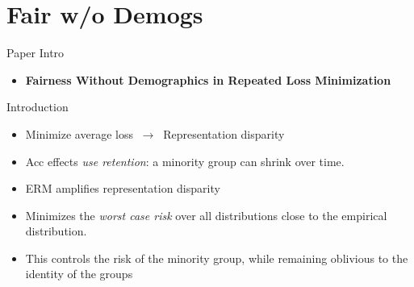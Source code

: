 \documentclass{beamer}
\begin{document}
\section{Fair w/o Demogs}
\begin{viterbiframe}{{Paper Intro}}
\begin{itemize}
    \item {\bf Fairness Without Demographics in Repeated Loss Minimization}
\end{itemize}
\end{viterbiframe}

\begin{viterbiframe}{Introduction}
    \begin{itemize}
        \item Minimize average loss $~\rightarrow~$ Representation disparity
        \pause
        \item Acc effects \emph{use retention}: a minority group can shrink over time.
        \pause
        \item ERM amplifies representation disparity
        \pause
        \item Minimizes the \emph{worst case risk} 
        \pause
        over all distributions close to the empirical distribution.
        \item This controls the risk of the minority group, while remaining oblivious to the identity of the groups
        
    \end{itemize}
    
\end{viterbiframe}
\end{document}
